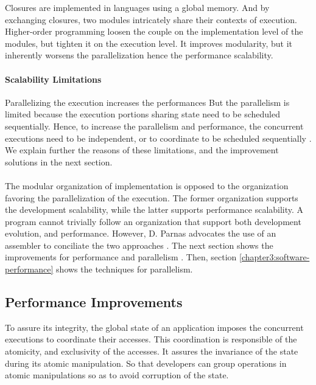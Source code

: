 Closures are implemented in languages using a global memory.
And by exchanging closures, two modules intricately share their contexts of execution.
Higher-order programming loosen the couple on the implementation level of the modules, but tighten it on the execution level.
It improves modularity, but it inherently worsens the parallelization hence the performance scalability.

\paragraph{Scalability Limitations}

Parallelizing the execution increases the performances \cite{Amdahl1967,Gunther1993}
But the parallelism is limited because the execution portions sharing state need to be scheduled sequentially.
Hence, to increase the parallelism and performance, the concurrent executions need to be independent, or to coordinate to be scheduled sequentially \cite{Gustafson1988,Gunther1996,Nelson1996,Gunther2002}.
We explain further the reasons of these limitations, and the improvement solutions in the next section.

\paragraph{}

The modular organization of implementation is opposed to the organization favoring the parallelization of the execution.
The former organization supports the development scalability, while the latter supports performance scalability.
A program cannot trivially follow an organization that support both development evolution, and performance.
However, D. Parnas advocates the use of an assembler to conciliate the two approaches \cite{Parnas1972}.
The next section shows the improvements for performance and parallelism .
Then, section \ref{chapter3:software-performance} shows the techniques for parallelism.

\subsection{Performance Improvements} \label{chapter3:software-maintainability:performance}

To assure its integrity, the global state of an application imposes the concurrent executions to coordinate their accesses.
This coordination is responsible of the atomicity, and exclusivity of the accesses.
It assures the invariance of the state during its atomic manipulation.
So that developers can group operations in atomic manipulations so as to avoid corruption of the state.

